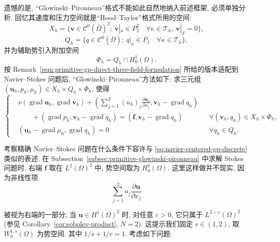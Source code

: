 遗憾的是, ``Glowinski--Pironneau''格式不能如此自然地纳入前述框架,
必须单独分析. 回忆其速度和压力空间就是``Hood--Taylor''格式所用的空间:
\[
X_h=\{\boldsymbol v\in\mathcal C^0(\bar\Omega)^2;
\ \boldsymbol v|_\kappa\in P_2^2\quad\forall\kappa\in\mathcal T_h,
\ \boldsymbol v|_\Gamma=0\},
\]
\[
Q_h=\{q\in\mathcal C^0(\bar\Omega);
\ q|_\kappa\in P_1\quad\forall\kappa\in\mathcal T_h\},
\]
并为辅助势引入附加空间
\[
\Phi_h=Q_h\cap H_0^1(\Omega).
\]
按 Remark~\ref{rem:primitive-gp-direct-three-field-formulation} 所给的版本适配到
Navier--Stokes 问题后, ``Glowinski--Pironneau''方法如下:
求三元组 $(\boldsymbol u_h,p_h,\mu_h)\in X_h\times Q_h\times\Phi_h$, 使得
\begin{equation}\label{eq:navier-centered-gp-discrete}
\left\{
\begin{aligned}
&\nu(\operatorname{grad}\boldsymbol u_h,
\operatorname{grad}\boldsymbol v_h)
+\left(\sum_{j=1}^{2}(u_h)_j
\frac{\partial\boldsymbol u_h}{\partial x_j},
\boldsymbol v_h-\operatorname{grad}q_h\right)\\
&\qquad
+(\operatorname{grad}p_h,
\boldsymbol v_h-\operatorname{grad}q_h)
=(\boldsymbol f,\boldsymbol v_h-\operatorname{grad}q_h)
&&\forall(\boldsymbol v_h,q_h)\in X_h\times\Phi_h,\\
&(\boldsymbol u_h-\operatorname{grad}\mu_h,
\operatorname{grad}q_h)=0
&&\forall q_h\in Q_h.
\end{aligned}
\right.
\end{equation}

考察精确 Navier--Stokes 问题在什么条件下容许与
\eqref{eq:navier-centered-gp-discrete} 类似的表述. 在
Subsection~\ref{subsec:primitive-glowinski-pironneau} 中求解 Stokes 问题时,
右端 $\boldsymbol f$ 取在 $L^2(\Omega)^2$ 中, 势空间取为 $H_0^1(\Omega)$.
这里这样做并不现实, 因为非线性项
\[
\sum_{j=1}^{2}u_j\frac{\partial\boldsymbol u}{\partial x_j}
\]

被视为右端的一部分; 当 $\boldsymbol u\in H^1(\Omega)^2$ 时, 对任意
$\varepsilon>0$, 它只属于 $L^{2-\varepsilon}(\Omega)^2$(参见
Corollary~\ref{cor:sobolev-product}, $N=2$). 这提示我们固定
$r\in(1,2)$, 取 $W_0^{1,s}(\Omega)$ 为势空间, 其中
$1/s+1/r=1$. 考虑如下问题:

